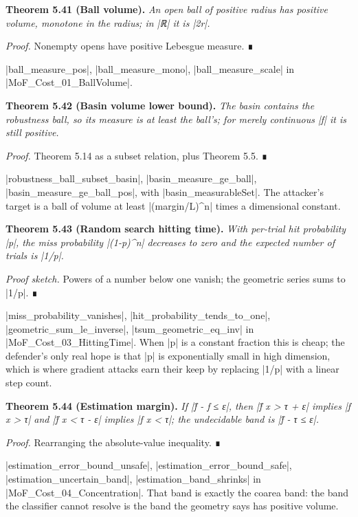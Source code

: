 \documentclass{memoir}
\begin{document}
\textbf{Theorem 5.41 (Ball volume).} \emph{An open ball of positive radius has positive volume,
monotone in the radius; in \LeanVerb|ℝ| it is \LeanVerb|2r|.}

\emph{Proof.} Nonempty opens have positive Lebesgue measure. ∎

\LeanVerb|ball_measure_pos|, \LeanVerb|ball_measure_mono|, \LeanVerb|ball_measure_scale| in
\LeanVerb|MoF_Cost_01_BallVolume|.

\textbf{Theorem 5.42 (Basin volume lower bound).} \emph{The basin contains the robustness ball, so
its measure is at least the ball's; for merely continuous \LeanVerb|f| it is still
positive.}

\emph{Proof.} Theorem 5.14 as a subset relation, plus Theorem 5.5. ∎

\LeanVerb|robustness_ball_subset_basin|, \LeanVerb|basin_measure_ge_ball|,
\LeanVerb|basin_measure_ge_ball_pos|, with \LeanVerb|basin_measurableSet|. The attacker's target
is a ball of volume at least \LeanVerb|(margin/L)^n| times a dimensional constant.

\textbf{Theorem 5.43 (Random search hitting time).} \emph{With per-trial hit probability \LeanVerb|p|, the miss
probability \LeanVerb|(1-p)^n| decreases to zero and the expected number of trials is
\LeanVerb|1/p|.}

\emph{Proof sketch.} Powers of a number below one vanish; the geometric series sums to
\LeanVerb|1/p|. ∎

\LeanVerb|miss_probability_vanishes|, \LeanVerb|hit_probability_tends_to_one|,
\LeanVerb|geometric_sum_le_inverse|, \LeanVerb|tsum_geometric_eq_inv| in
\LeanVerb|MoF_Cost_03_HittingTime|. When \LeanVerb|p| is a constant fraction this is cheap; the
defender's only real hope is that \LeanVerb|p| is exponentially small in high dimension,
which is where gradient attacks earn their keep by replacing \LeanVerb|1/p| with a linear
step count.

\textbf{Theorem 5.44 (Estimation margin).} \emph{If \LeanVerb|f̂ - f ≤ ε|, then \LeanVerb|f̂ x > τ + ε| implies
\LeanVerb|f x > τ| and \LeanVerb|f̂ x < τ - ε| implies \LeanVerb|f x < τ|; the undecidable band is \LeanVerb|f̂ - τ ≤ ε|.}

\emph{Proof.} Rearranging the absolute-value inequality. ∎

\LeanVerb|estimation_error_bound_unsafe|, \LeanVerb|estimation_error_bound_safe|,
\LeanVerb|estimation_uncertain_band|, \LeanVerb|estimation_band_shrinks| in
\LeanVerb|MoF_Cost_04_Concentration|. That band is exactly the coarea band: the band the
classifier cannot resolve is the band the geometry says has positive volume.
\end{document}
